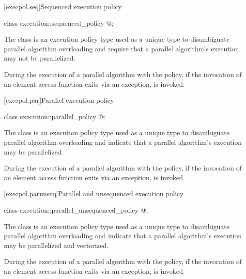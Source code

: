 [execpol.seq]{Sequenced execution policy}

%
\begin{itemdecl}
class execution::sequenced_policy { @\unspec@ };
\end{itemdecl}

\begin{itemdescr}
\pnum
The class  is an execution policy type used
as a unique type to disambiguate parallel algorithm overloading and require
that a parallel algorithm's execution may not be parallelized.

\pnum
During the execution of a parallel algorithm with
the  policy,
if the invocation of an element access function exits via an exception,
 is invoked.
\end{itemdescr}

[execpol.par]{Parallel execution policy}

%
\begin{itemdecl}
class execution::parallel_policy { @\unspec@ };
\end{itemdecl}

\begin{itemdescr}
\pnum
The class  is an execution policy type used as
a unique type to disambiguate parallel algorithm overloading and indicate that
a parallel algorithm's execution may be parallelized.

\pnum
During the execution of a parallel algorithm with
the  policy,
if the invocation of an element access function exits via an exception,
 is invoked.
\end{itemdescr}

[execpol.parunseq]{Parallel and unsequenced execution policy}

%
\begin{itemdecl}
class execution::parallel_unsequenced_policy { @\unspec@ };
\end{itemdecl}

\begin{itemdescr}
\pnum
The class  is an execution policy type
used as a unique type to disambiguate parallel algorithm overloading and
indicate that a parallel algorithm's execution may be parallelized and
vectorized.

\pnum
During the execution of a parallel algorithm with
the  policy,
if the invocation of an element access function exits via an exception,
 is invoked.
\end{itemdescr}

